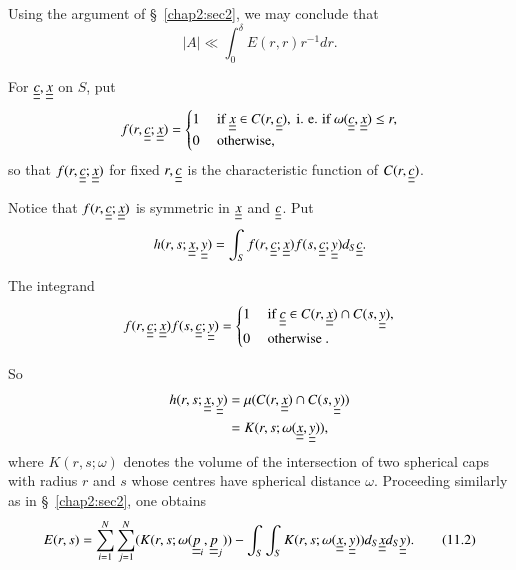 Using the argument of \S\ \ref{chap2:sec2}, we may conclude that
\begin{equation*}
|A| \ll \int_{0}^{\delta} E(r, r) r^{-1} dr.\tag{11.1}\label{chap2:sec11:eq11.1}
\end{equation*}

For $\underline{\underline{c}}, \underline{\underline{x}}$ on $S$, put
\begin{equation*}
f(r, \underline{\underline{c}} ; \underline{\underline{x}}) = 
\begin{cases}
1 & \text{ if } \underline{\underline{x}} \in C(r, \underline{\underline{c}}), \text{ i. e. if } \omega (\underline{\underline{c}}, \underline{\underline{x}}) \leq r,\\
0 & \text{ otherwise, }
\end{cases}
\end{equation*}\pageoriginale
so that $f(r, \underline{\underline{c}} ; \underline{\underline{x}})$ for fixed $r, \underline{\underline{c}}$ is the characteristic function of $C(r, \underline{\underline{c}})$.

Notice that $f(r, \underline{\underline{c}} ; \underline{\underline{x}})$ is symmetric in $\underline{\underline{x}}$ and $\underline{\underline{c}}$. Put
$$
h(r, s ; \underline{\underline{x}}, \underline{\underline{y}}) = \int_{S} f(r, \underline{\underline{c}} ; \underline{\underline{x}}) f(s, \underline{\underline{c}} ; \underline{\underline{y}}) d_{S} \underline{\underline{c}}.
$$

The integrand
\begin{equation*}
f(r, \underline{\underline{c}} ; \underline{\underline{x}}) f(s, \underline{\underline{c}} ; \underline{\underline{y}}) = 
\begin{cases}
1 & \text{ if } \underline{\underline{c}} \in C(r, \underline{\underline{x}}) \cap C(s, \underline{\underline{y}}),\\
0 & \text{ otherwise }.\\
\end{cases}
\end{equation*}

So
\begin{align*}
h(r, s ; \underline{\underline{x}}, \underline{\underline{y}}) & = \mu(C(r, \underline{\underline{x}})\cap C(s, \underline{\underline{y}}))\\
& = K(r, s ; \omega(\underline{\underline{x}}, \underline{\underline{y}})),
\end{align*}
where $K(r, s ; \omega)$ denotes the volume of the intersection of two spherical caps with radius $r$ and $s$ whose centres have spherical distance $\omega$. Proceeding similarly as in \S\ \ref{chap2:sec2}, one obtains
\begin{equation*}
E(r, s) = \sum_{i=1}^{N} \sum_{j=1}^{N} (K(r, s ; \omega(\underline{\underline{p}}_{i}, \underline{\underline{p}}_{j})) - \int_{S} \int_{S} K(r, s ; \omega(\underline{\underline{x}}, \underline{\underline{y}})) d_{S} \underline{\underline{x}} d_{S} \underline{\underline{y}}).\tag{11.2}\label{chap2:sec11:eq11.2}
\end{equation*}

